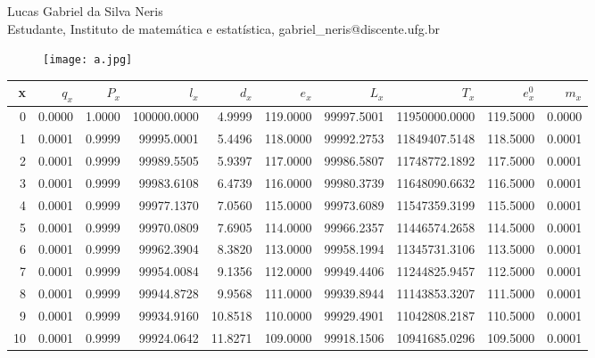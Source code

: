 \documentclass[11pt]{article}
\begin{document}
	\begin{center}
		Lucas Gabriel da Silva Neris\\Estudante, Instituto de matemática e estatística, gabriel\_neris@discente.ufg.br \\	
	\end{center}
\begin{center}
	\begin{figure}[H]
		\texttt{[image: a.jpg]}
	\end{figure}
\end{center}
\begin{tabular}{|r|r|r|r|r|r|r|r|r|r|}
 	\hline
 	\textbf{x} &     \textbf{$q_{x}$} &     \textbf{$P_{x}$} &          \textbf{$l_{x}$} &        \textbf{$d_{x}$} &       \textbf{$e_{x}$} &         \textbf{$L_{x}$} &            \textbf{$T_{x}$} &      \textbf{$e_{x}^{ 0}$}&            \textbf{$m_{x}$}\\
    \hline
0 & 0.0000 & 1.0000 & 100000.0000 &    4.9999 & 119.0000 & 99997.5001 & 11950000.0000 & 119.5000 & 0.0000 \\
1 & 0.0001 & 0.9999 &  99995.0001 &    5.4496 & 118.0000 & 99992.2753 & 11849407.5148 & 118.5000 & 0.0001 \\
2 & 0.0001 & 0.9999 &  99989.5505 &    5.9397 & 117.0000 & 99986.5807 & 11748772.1892 & 117.5000 & 0.0001 \\
3 & 0.0001 & 0.9999 &  99983.6108 &    6.4739 & 116.0000 & 99980.3739 & 11648090.6632 & 116.5000 & 0.0001 \\
4 & 0.0001 & 0.9999 &  99977.1370 &    7.0560 & 115.0000 & 99973.6089 & 11547359.3199 & 115.5000 & 0.0001 \\
5 & 0.0001 & 0.9999 &  99970.0809 &    7.6905 & 114.0000 & 99966.2357 & 11446574.2658 & 114.5000 & 0.0001 \\
6 & 0.0001 & 0.9999 &  99962.3904 &    8.3820 & 113.0000 & 99958.1994 & 11345731.3106 & 113.5000 & 0.0001 \\
7 & 0.0001 & 0.9999 &  99954.0084 &    9.1356 & 112.0000 & 99949.4406 & 11244825.9457 & 112.5000 & 0.0001 \\
8 & 0.0001 & 0.9999 &  99944.8728 &    9.9568 & 111.0000 & 99939.8944 & 11143853.3207 & 111.5000 & 0.0001 \\
9 & 0.0001 & 0.9999 &  99934.9160 &   10.8518 & 110.0000 & 99929.4901 & 11042808.2187 & 110.5000 & 0.0001 \\
10 & 0.0001 & 0.9999 &  99924.0642 &   11.8271 & 109.0000 & 99918.1506 & 10941685.0296 & 109.5000 & 0.0001 \\

\end{tabular}
\end{document}
